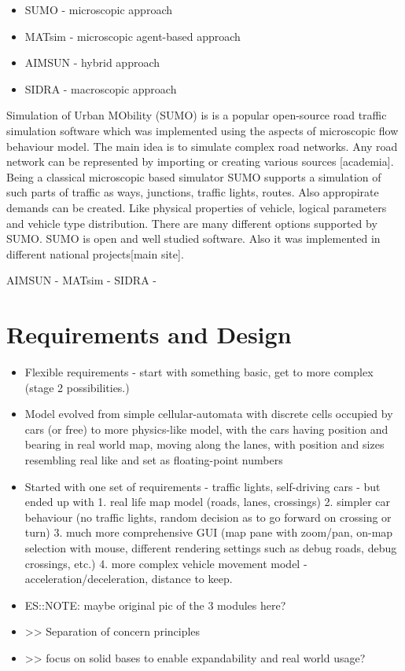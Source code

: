 \begin{itemize}
    \item SUMO -  microscopic approach
    \item MATsim - microscopic agent-based approach
    \item AIMSUN - hybrid approach
    \item SIDRA - macroscopic approach
\end{itemize}

Simulation of Urban MObility (SUMO) is is a popular open-source road traffic simulation software which was implemented using the aspects of microscopic flow behaviour model.
The main idea is to simulate complex road networks. Any road network can be represented by importing or creating various sources [academia].
Being a classical microscopic based simulator SUMO supports a simulation of such parts of traffic as ways, junctions, traffic lights, routes.
Also appropirate demands can be created. Like physical properties of vehicle, logical parameters and vehicle type distribution.
There are many different options supported by SUMO.
SUMO is open and well studied software. Also it was implemented in different national projects[main site].

 AIMSUN -
 MATsim -
 SIDRA -


\section{Requirements and Design}
\begin{itemize}
    \item Flexible requirements - start with something basic, get to more complex (stage 2 possibilities.)
    \item Model evolved from simple cellular-automata with discrete cells occupied by cars (or free) to more physics-like model, with the cars having position and bearing in real world map, moving along the lanes, with position and sizes resembling real like and set as floating-point numbers
    \item Started with one set of requirements - traffic lights, self-driving cars - but ended up with 1. real life map model (roads, lanes, crossings) 2. simpler car behaviour (no traffic lights, random decision as to go forward on crossing or turn) 3. much more comprehensive GUI (map pane with zoom/pan, on-map selection with mouse, different rendering settings such as debug roads, debug crossings, etc.) 4. more complex vehicle movement model - acceleration/deceleration, distance to keep.
	\item ES::NOTE: maybe original pic of the 3 modules here?
	\item >> Separation of concern principles
	\item >> focus on solid bases to enable expandability and real world usage?
\end{itemize}

